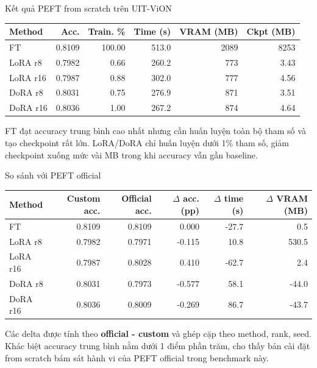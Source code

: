 \documentclass[11pt,aspectratio=169]{beamer}
\begin{document}
\begin{frame}{Kết quả PEFT from scratch trên UIT-ViON}
\centering
\scriptsize
\begin{tabular}{lrrrrr}
\toprule
Method & Acc. & Train. \% & Time (s) & VRAM (MB) & Ckpt (MB) \\
\midrule
FT & 0.8109 & 100.00 & 513.0 & 2089 & 8253 \\
LoRA r8 & 0.7982 & 0.66 & 260.2 & 773 & 3.43 \\
LoRA r16 & 0.7987 & 0.88 & 302.0 & 777 & 4.56 \\
DoRA r8 & 0.8031 & 0.75 & 276.9 & 871 & 3.51 \\
DoRA r16 & 0.8036 & 1.00 & 267.2 & 874 & 4.64 \\
\bottomrule
\end{tabular}

\vspace{0.25cm}
\begin{minipage}{0.86\textwidth}
\footnotesize
FT đạt accuracy trung bình cao nhất nhưng cần huấn luyện toàn bộ tham số và tạo checkpoint rất lớn.
LoRA/DoRA chỉ huấn luyện dưới 1\% tham số, giảm checkpoint xuống mức vài MB trong khi accuracy vẫn gần baseline.
\end{minipage}
\end{frame}

\begin{frame}{So sánh với PEFT official}
\centering
\scriptsize
\begin{tabular}{lrrrrr}
\toprule
Method & Custom acc. & Official acc. & $\Delta$ acc. (pp) & $\Delta$ time (s) & $\Delta$ VRAM (MB) \\
\midrule
FT & 0.8109 & 0.8109 & 0.000 & -27.7 & 0.5 \\
LoRA r8 & 0.7982 & 0.7971 & -0.115 & 10.8 & 530.5 \\
LoRA r16 & 0.7987 & 0.8028 & 0.410 & -62.7 & 2.4 \\
DoRA r8 & 0.8031 & 0.7973 & -0.577 & 58.1 & -44.0 \\
DoRA r16 & 0.8036 & 0.8009 & -0.269 & 86.7 & -43.7 \\
\bottomrule
\end{tabular}

\vspace{0.25cm}
\begin{minipage}{0.86\textwidth}
\footnotesize
Các delta được tính theo \textbf{official - custom} và ghép cặp theo method, rank, seed.
Khác biệt accuracy trung bình nằm dưới 1 điểm phần trăm, cho thấy bản cài đặt from scratch bám sát hành vi của PEFT official trong benchmark này.
\end{minipage}
\end{frame}
\end{document}
